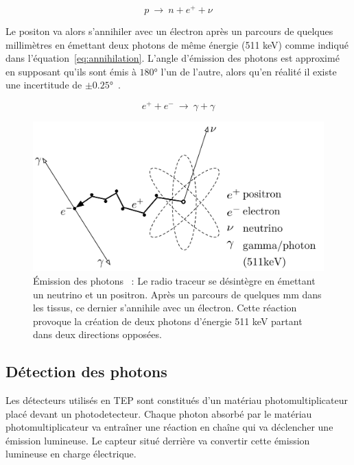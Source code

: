 \begin{equation}
 p~\rightarrow~n + e^+ + \nu
\label{eq:desinteg}
\end{equation}

Le positon va alors s'annihiler avec un électron après un parcours de quelques millimètres en émettant deux photons de même énergie (511 keV) comme indiqué dans l'équation~\ref{eq:annihilation}. L'angle d'émission des photons est approximé en supposant qu'ils sont émis à $180°$ l'un de l'autre, alors qu'en réalité il existe une incertitude de $\pm 0.25°$~\cite{bailey2005positron}.

\begin{equation}
 e^+ + e^-~\rightarrow~\gamma + \gamma
\label{eq:annihilation}
\end{equation}

\begin{figure}
\centering
\includegraphics[width=12cm]{images/annihilation}
\caption[\'Emission des photons]{\'Emission des photons~\cite{Langner2008ad} : Le radio traceur se désintègre en émettant un neutrino et un positron. Après un parcours de quelques mm dans les tissus, ce dernier s'annihile avec un électron. Cette réaction provoque la création de deux photons d'énergie 511 keV partant dans deux directions opposées.}
\label{fig:Langner2008ad}
\end{figure}

	\subsection{Détection des photons}

Les détecteurs utilisés en TEP sont constitués d'un matériau photomultiplicateur placé devant un photodetecteur. Chaque photon absorbé par le matériau photomultiplicateur va entraîner une réaction en chaîne qui va déclencher une émission lumineuse. Le capteur situé derrière va convertir cette émission lumineuse en charge électrique.

